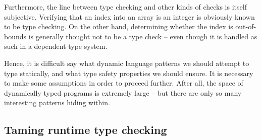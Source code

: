 Furthermore, the line between type checking and other kinds of checks is itself subjective.
Verifying that an index into an array is an integer is obviously known to be type checking.
On the other hand, determining whether the index is out-of-bounds is generally thought not to be a type check -- even though it is handled as such in a dependent type system. 

Hence, it is difficult say what dynamic language patterns we should attempt to type statically, and what type safety properties we should ensure. It is necessary to make some assumptions in order to proceed further.
After all, the space of dynamically typed programs is extremely large -- but there are only so many interesting patterns hiding within.

\needspace{6em}
\subsection{Taming runtime type checking}
\label{subsec:runtime-type-checking}

